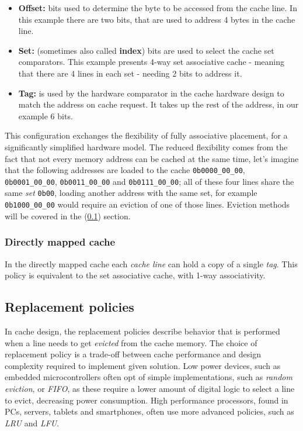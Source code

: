 \begin{itemize}
	\item \textbf{Offset:} bits used to determine the byte to be accessed from the cache line. In this example there are two bits, that are used to address 4 bytes in the cache line.
	\item \textbf{Set:} (sometimes also called \textbf{index}) bits are used to select the cache set comparators. This example presents 4-way set associative cache - meaning that there are 4 lines
		in each set - needing 2 bits to address it.
	\item \textbf{Tag:} is used by the hardware comparator in the cache hardware design to match the address on cache request. It takes up the rest of the address, in our example 6 bits.
\end{itemize}

\noindent This configuration exchanges the flexibility of fully associative placement, for a significantly simplified hardware model. The reduced flexibility comes from the fact that
not every memory address can be cached at the same time, let's imagine that the following addresses are loaded to the cache \texttt{0b0000\_00\_00}, \texttt{0b0001\_00\_00}, \texttt{0b0011\_00\_00}
and \texttt{0b0111\_00\_00}; all of these four lines share the same \textit{set} \texttt{0b00}, loading another address with the same set, for example \texttt{0b1000\_00\_00} would require 
an eviction of one of those lines. Eviction methods will be covered in the (\ref{sec:eviction_policies}) section.


\subsubsection{Directly mapped cache}
In the directly mapped cache each \textit{cache line} can hold a copy of a single \textit{tag}. This policy is equivalent to the set associative cache, with 1-way associativity.

%
\subsection{Replacement policies} \label{sec:eviction_policies}
In cache design, the replacement policies describe behavior that is performed when a line needs to get \textit{evicted} from the cache memory.
The choice of replacement policy is a trade-off between cache performance and design complexity required to implement given solution. Low power
devices, such as embedded microcontrollers often opt of simple implementations, such as \textit{random eviction}, or \textit{FIFO}, as these require %
a lower amount of digital logic to select a line to evict, decreasing power consumption. High performance processors, found in PCs, servers, tablets and smartphones,
often use more advanced policies, such as \textit{LRU} and \textit{LFU}.

